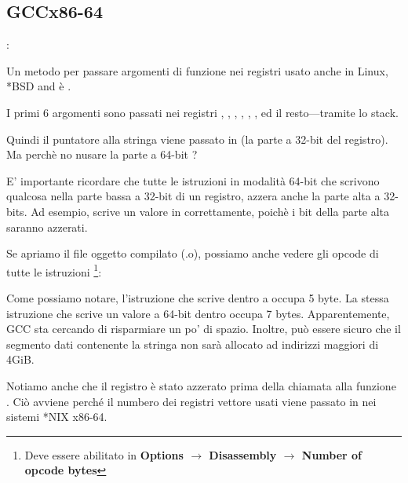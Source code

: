 \subsection{GCC\EMDASH{}x86-64}

\ITAph{}:



Un metodo per passare argomenti di funzione nei registri usato anche in Linux, *BSD and \MacOSX è \SysVABI.

I primi 6 argomenti sono passati nei registri \RDI, \RSI, \RDX, \RCX, ,   , ed il resto---tramite lo stack.

Quindi il puntatore alla stringa viene passato in \EDI (la parte a 32-bit del registro).
Ma perchè no nusare la parte a 64-bit \RDI?

E' importante ricordare che tutte le istruzioni \MOV in modalità 64-bit che scrivono qualcosa nella parte bassa a 32-bit di un registro, azzera anche la parte alta a 32-bits.
Ad esempio,  scrive un valore in \RAX correttamente, poichè i bit della parte alta saranno azzerati.

Se apriamo il file oggetto compilato (.o), possiamo anche vedere gli opcode di tutte le istruzioni
\footnote{Deve essere abilitato in \textbf{Options $\rightarrow$ Disassembly $\rightarrow$ Number of opcode bytes}}:



\label{hw_EDI_instead_of_RDI}
Come possiamo notare, l'istruzione che scrive dentro \EDI a  occupa 5 byte.
La stessa istruzione che scrive un valore a 64-bit dentro \RDI occupa 7 bytes.
Apparentemente, GCC sta cercando di risparmiare un po' di spazio.
Inoltre, può essere sicuro che il segmento dati contenente la stringa non sarà allocato ad indirizzi maggiori di 4\gls{GiB}.

\label{SysVABI_input_EAX}
Notiamo anche che il registro \EAX è stato azzerato prima della chiamata alla funzione \printf .
Ciò avviene perché il numbero dei registri vettore usati viene passato in \EAX nei sistemi *NIX x86-64.

